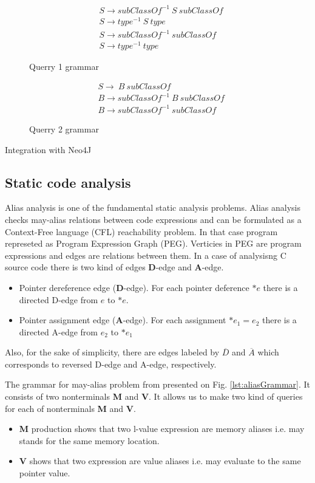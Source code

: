 \begin{figure}[t]
\begin{align*}
& S \rightarrow subClassOf^{-1}\ S\ subClassOf\\
& S \rightarrow type^{-1}\ S\ type\\
& S \rightarrow subClassOf^{-1}\ subClassOf\\
& S \rightarrow type^{-1}\ type
\end{align*}
\caption{Querry 1 grammar}
\label{lst:query1}
\end{figure}

\begin{figure}[t]
\begin{align*}
& S \rightarrow\ B\ subClassOf\\
& B \rightarrow subClassOf^{-1}\ B\ subClassOf\\
& B \rightarrow subClassOf^{-1}\ subClassOf
\end{align*}
\caption{Querry 2 grammar}
\label{lst:query2}
\end{figure}



Integration with Neo4J

\subsection{Static code analysis}

Alias analysis is one of the fundamental static analysis problems\cite{Marlowe}. Alias analysis checks may-alias relations between code expressions and can be formulated as a Context-Free language (CFL) reachability problem\cite{Reps}. In that case program represeted as Program Expression Graph (PEG)\cite{Zheng}. Verticies in PEG are program expressions and edges are relations between them. In a case of analysisng C source code there is two kind of edges \textbf{D}-edge and \textbf{A}-edge.
\begin{itemize}
    \item Pointer dereference edge (\textbf{D}-edge). For each pointer deference $*e$ there is a directed D-edge from $e$ to $*e$.
    \item Pointer assignment edge (\textbf{A}-edge). For each assignment $*e_1=e_2$ there is a directed A-edge from $e_2$ to $*e_1$
\end{itemize}
Also, for the sake of simplicity, there are edges labeled by $\overline{D}$ and $\overline{A}$ which corresponds to reversed D-edge and A-edge, respectively.

The grammar for may-alias problem from \cite{Zheng} presented on Fig. \ref{lst:aliasGrammar}. It consists of two nonterminals \textbf{M} and \textbf{V}. It allows us to make two kind of queries for each of nonterminals \textbf{M} and \textbf{V}.
\begin{itemize}
    \item \textbf{M} production shows that two l-value expression are memory aliases i.e. may stands for the same memory location.
    \item \textbf{V} shows that two expression are value aliases i.e. may evaluate to the same pointer value.
\end{itemize}

